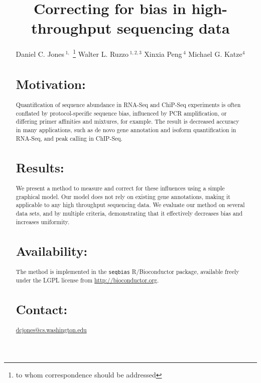 \documentclass{bioinfo}
\begin{document}

\title{Correcting for bias in high-throughput sequencing data}
\author[Jones \textit{et~al}]
{Daniel C. Jones\,$^{1,}$
\footnote{to whom correspondence should be addressed}\hspace{0.5em}
Walter L. Ruzzo\,$^{1,2,3}$
Xinxia Peng\,$^{4}$
Michael G. Katze$^{4}$
}


\address{
$^{1}$Department of Computer Science and Engineering, University of
Washington, Seattle, WA 98195-2350, USA\\
$^{2}$Department of Genome Sciences, University of Washington, Seattle, Wa
98195-5065, USA\\
$^{3}$Fred Hutchinson Cancer Research Center, Seattle, WA 98109, USA\\
$^{4}$Department of Microbiology, University of Washington, Seattle, WA
98195-7242, USA}


\maketitle

\begin{abstract}

\section{Motivation:}
Quantification of sequence abundance in RNA-Seq and ChiP-Seq experiments is
often conflated by protocol-specific sequence bias, influenced by PCR
amplification, or differing primer affinities and mixtures, for example.  The
result is decreased accuracy in many applications, such as de novo gene
annotation and isoform quantification in RNA-Seq, and peak calling in
ChIP-Seq.


\section{Results:}
We present a method to measure and correct for these influences using a simple
graphical model. Our model does not rely on existing gene annotations, making it
applicable to any high throughput sequencing data. We evaluate our method on
several data sets, and by multiple criteria, demonstrating that it effectively
decreases bias and increases uniformity.


\section{Availability:}
The method is implemented in the \texttt{seqbias} R/Bioconductor package,
available freely under the LGPL license from
\href{http://bioconductor.org}{http://bioconductor.org}.


\section{Contact:}
\href{dcjones@cs.washington.edu}{dcjones@cs.washington.edu}

\end{abstract}
\end{document}
